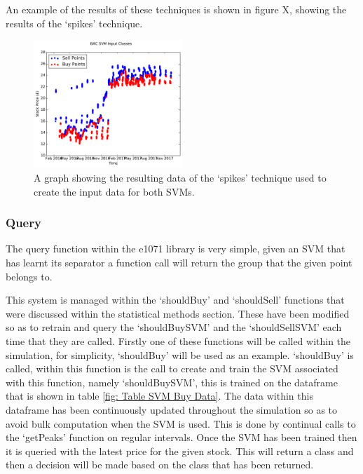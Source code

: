 \documentclass[conference]{IEEEtran}
\begin{document}
An example of the results of these techniques is shown in figure X, showing the results of the `spikes' technique. 

\begin{figure}
\includegraphics[width=0.5\textwidth, angle=0]{Poster/SVMBuyPoints.pdf}
\caption{A graph showing the resulting data of the `spikes' technique used to create the input data for both SVMs.}
\label{fig:SVMBuyPoints}
\end{figure}

\subsubsection{Query}

The query function within the e1071 library is very simple, given an SVM that has learnt its separator a function call will return the group that the given point belongs to.

This system is managed within the `shouldBuy' and `shouldSell' functions that were discussed within the statistical methods section. These have been modified so as to retrain and query the `shouldBuySVM' and the `shouldSellSVM' each time that they are called. Firstly one of these functions will be called within the simulation, for simplicity, `shouldBuy' will be used as an example. `shouldBuy' is called, within this function is the call to create and train the SVM associated with this function, namely `shouldBuySVM', this is trained on the dataframe that is shown in table \ref{fig: Table SVM Buy Data}. The data within this dataframe has been continuously updated throughout the simulation so as to avoid bulk computation when the SVM is used. This is done by continual calls to the `getPeaks' function on regular intervals. Once the SVM has been trained then it is queried with the latest price for the given stock. This will return a class and then a decision will be made based on the class that has been returned.

\end{document}
